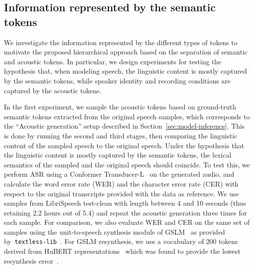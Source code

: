 \documentclass[letterpaper,10 pt]{IEEEtran}
\begin{document}
\subsection{Information represented by the semantic tokens} \label{sec:exp-semantic}

We investigate the information represented by the different types of tokens to motivate the proposed hierarchical approach based on the separation of semantic and acoustic tokens. In particular, we design experiments for testing the hypothesis that, when modeling speech, the linguistic content is mostly captured by the semantic tokens, while speaker identity and recording conditions are captured by the acoustic tokens.

In the first experiment, we sample the acoustic tokens based on ground-truth semantic tokens extracted from the original speech samples, which corresponds to the ``Acoustic generation'' setup described in Section~\ref{sec:model-inference}. This is done by running the second and third stages, then comparing the linguistic content of the sampled speech to the original speech. Under the hypothesis that the linguistic content is mostly captured by the semantic tokens, the lexical semantics of the sampled and the original speech should coincide. To test this, we perform ASR using a Conformer Transducer-L~\cite{conformertransducer2020} on the generated audio, and calculate the word error rate (WER) and the character error rate (CER) with respect to the original transcripts provided with the data as reference. We use samples from LibriSpeech test-clean with length between 4 and 10 seconds (thus retaining 2.2 hours out of 5.4) and repeat the acoustic generation three times for each sample. For comparison, we also evaluate WER and CER on the same set of samples using the unit-to-speech synthesis module of GSLM~\cite{lakhotia2021generative} as provided by~\texttt{textless-lib}~\cite{textlessLib}. For GSLM resynthesis, we use a vocabulary of 200 tokens derived from HuBERT representations~\cite{hsu2021} which was found to provide the lowest resynthesis error~\cite{lakhotia2021generative}.
\end{document}
